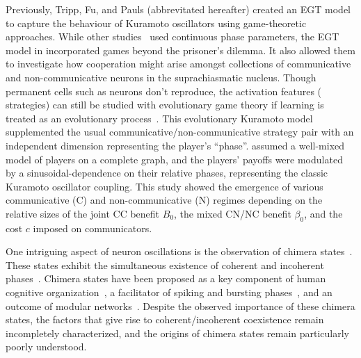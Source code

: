 \documentclass[pdflatex,lineno,referee,sn-nature]{sn-jnl}
\begin{document}
Previously, Tripp, Fu, and Pauls \citep{tripp2022evolutionary} (abbrevitated \tripp{} hereafter)
created an EGT model
to capture the behaviour of Kuramoto oscillators
using game-theoretic approaches.
While other studies~\citep{antonioni2017coevolution} used continuous phase parameters,
the EGT model in \tripp{} incorporated games beyond the prisoner's dilemma.
It also allowed them to investigate how cooperation might arise
amongst collections of communicative and non-communicative neurons
in the suprachiasmatic nucleus.
Though permanent cells such as neurons don't reproduce,
the activation features (\ie{} strategies) can still
be studied with evolutionary game theory
if learning is treated as
an evolutionary process~\citep{cohen2009evolutionary}.
This evolutionary Kuramoto model
supplemented the usual communicative/non-communicative
strategy pair with an independent dimension representing the player's ``phase''.
\tripp{} assumed a well-mixed model of players
on a complete graph, and the players' payoffs were modulated
by a sinusoidal-dependence on their relative phases,
representing the classic Kuramoto oscillator coupling.
This study showed the emergence of various communicative (C)
and non-communicative (N) regimes depending on the relative sizes
of the joint CC benefit $B_0$, the mixed CN/NC benefit $\beta_0$,
and the cost $c$ imposed on communicators.

One intriguing aspect of neuron oscillations
is the observation of chimera states~\citep
[\eg{}][and references therein]{majhi2019chimera}.
These states exhibit the simultaneous existence
of coherent and incoherent phases~\citep{abrams2004chimera}.
Chimera states have been proposed
as a key component of human cognitive organization~\citep{bansal2019cognitive},
a facilitator of spiking and bursting phases~\citep{santos2017chimera},
and an outcome of modular networks~\citep{hizanidis2016chimera}.
Despite the observed importance of these chimera states,
the factors that give rise to coherent/incoherent coexistence
remain incompletely characterized,
and the origins of chimera states
remain particularly poorly understood.
\end{document}
